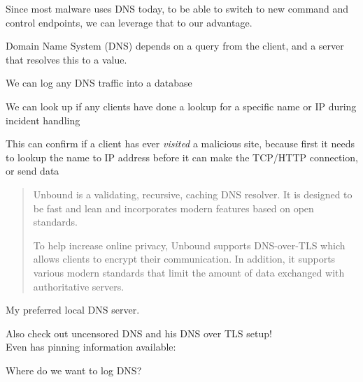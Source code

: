 \documentclass[Screen16to9,17pt]{foils}
\begin{document}

Since most malware uses DNS today, to be able to switch to new command and control endpoints, we can leverage that to our advantage.

Domain Name System (DNS) depends on a query from the client, and a server that resolves this to a value.

\begin{list2}
\item We can log any DNS traffic into a database
\item We can look up if any clients have done a lookup for a specific name or IP during incident handling
\item This can confirm if a client has ever \emph{visited} a malicious site, because first it needs to lookup the name to IP address before it can make the TCP/HTTP connection, or send data
\end{list2}





\begin{quote}
Unbound is a validating, recursive, caching DNS resolver. It is designed to be fast and lean and incorporates modern features based on open standards.

To help increase online privacy, Unbound supports DNS-over-TLS which allows clients to encrypt their communication. In addition, it supports various modern standards that limit the amount of data exchanged with authoritative servers.
\end{quote}


My preferred local DNS server.

Also check out uncensored DNS and his DNS over TLS setup!\\
Even has pinning information available:\\ {\small{}}









Where do we want to log DNS?
\end{document}
